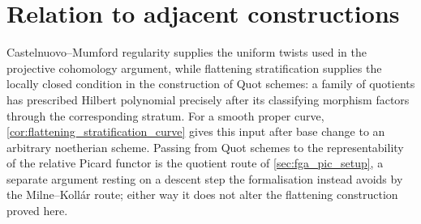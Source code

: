 \section{Relation to adjacent constructions}
\label{sec:flatstrat_out_of_scope}

Castelnuovo--Mumford regularity supplies the uniform twists used in the
projective cohomology argument, while flattening stratification supplies the
locally closed condition in the construction of Quot schemes: a family of
quotients has prescribed Hilbert polynomial precisely after its classifying
morphism factors through the corresponding stratum.  For a smooth proper
curve, \cref{cor:flattening_stratification_curve} gives this input after base
change to an arbitrary noetherian scheme.  Passing from Quot schemes to the
representability of the relative Picard functor is the quotient route of
\cref{sec:fga_pic_setup}, a separate argument resting on a descent step the
formalisation instead avoids by the Milne--Koll\'ar route; either way it does
not alter the flattening construction proved here.
